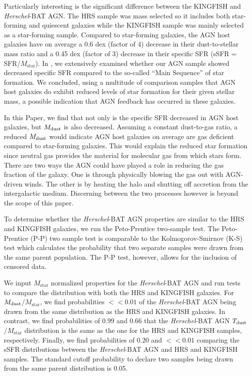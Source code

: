 \documentclass[fleqn, usenatbib]{mnras}
\newcommand{\herschel}{\emph{Herschel}}
\newcommand{\mstar}{$M_{\mathrm{star}}$}
\newcommand{\mdust}{$M_{\rm dust}$}
\newcommand{\tdust}{$T_{\rm dust}$}
\begin{document}
Particularly interesting is the significant difference between the KINGFISH and \herschel-BAT AGN. The HRS sample was mass selected so it includes both star-forming and quiescent galaxies while the KINGFISH sample was mainly selected as a star-forming sample. Compared to star-forming galaxies, the AGN host galaxies have on average a 0.6 dex (factor of 4) decrease in their dust-to-stellar mass ratio and a 0.45 dex (factor of 3) decrease in their specific SFR (sSFR = SFR/\mstar). In \citet{Shimizu:2015xo}, we extensively examined whether our AGN sample showed decreased specific SFR compared to the so-called ``Main Sequence'' of star formation. We concluded, using a multitude of comparison samples that AGN host galaxies do exhibit reduced levels of star formation for their given stellar mass, a possible indication that AGN feedback has occurred in these galaxies. 
 
In this Paper, we find that not only is the specific SFR decreased in AGN host galaxies, but \mdust{} is also decreased. Assuming a constant dust-to-gas ratio, a reduced \mdust{} would indicate AGN host galaxies on average are gas deficient compared to star-forming galaxies. This would explain the reduced star formation since neutral gas provides the material for molecular gas from which stars form. There are two ways the AGN could have played a role in reducing the gas fraction of the galaxy. One is through physically blowing the gas out with AGN-driven winds. The other is by heating the halo and shutting off accretion from the intergalactic medium. Discerning between the two processes however is beyond the scope of this paper.

To determine whether the \herschel-BAT AGN properties are similar to the HRS and KINGFISH galaxies, we run the Peto-Prentice two-sample test. The Peto-Prentice (P-P) two sample test is comparable to the Kolmogorov-Smirnov (K-S) test which calculates the probability that two separate samples were drawn from the same parent population.  The P-P test, however, allows for the inclusion of censored data. 

We input \mstar{} normalized properties for the \herschel-BAT AGN and run tests to compare the distribution with both the HRS and KINGFISH galaxies. For \mdust/\mstar{}, we find probabilities $<<0.01$ of the \herschel-BAT AGN being drawn from the same distribution as the HRS and KINGFISH galaxies. In contrast, we find probabilities of 0.99 and 0.66 that the \herschel-BAT AGN \tdust/\mstar{} distribution is the same as the one for the HRS and KINGFISH samples, respectively. Finally, we find probabilities of 0.20 and $<<0.01$ comparing the sSFR distributions between the \herschel-BAT AGN and HRS and KINGFISH samples. The standard cutoff probability to declare two samples being drawn from the same parent distribution is 0.05. 
\end{document}
